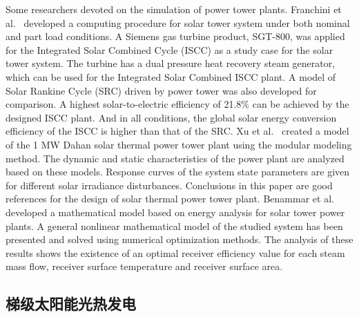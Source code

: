 Some researchers devoted on the simulation of power tower plants.
Franchini et al.~\cite{Franchini2013} developed a computing procedure for solar tower system under both nominal and part load conditions. A Siemens gas turbine product, SGT-800, was applied for the Integrated Solar Combined Cycle (ISCC) as a study case for the solar tower system. The turbine has a dual pressure heat recovery steam generator, which can be used for the Integrated Solar Combined ISCC plant. A model of Solar Rankine Cycle (SRC) driven by power tower was also developed for comparison. A highest solar-to-electric efficiency of 21.8\% can be achieved by the designed ISCC plant. And in all conditions, the global solar energy conversion efficiency of the ISCC is higher than that of the SRC.
Xu et al.~\cite{Xu2011a,Xu2012} created a model of the 1 MW Dahan solar thermal power tower plant using the modular modeling method. The dynamic and static characteristics of the power plant are analyzed based on these models. Response curves of the system state parameters are given for different solar irradiance disturbances. Conclusions in this paper are good references for the design of solar thermal power tower plant.
Benammar et al.~\cite{Benammar2014} developed a mathematical model based on energy analysis for solar tower power plants. A general nonlinear mathematical model of the studied system  has been presented and solved using numerical optimization methods. The analysis of these results shows the existence of an optimal receiver efficiency value for each steam mass flow, receiver surface temperature and receiver surface area.

\subsection{梯级太阳能光热发电}
\label{sec:cs}

